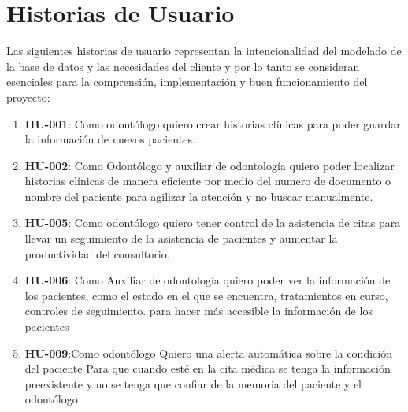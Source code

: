 \documentclass[conference]{IEEEtran}
\begin{document}
\section{Historias de Usuario} Las siguientes historias de usuario representan la intencionalidad del modelado de la base de datos y las necesidades del cliente y por lo tanto se consideran esenciales para la comprensión, implementación y buen funcionamiento del proyecto:

\begin{enumerate}

    \item \textbf{HU-001}:
    Como odontólogo \newline
    quiero crear historias clínicas\newline
    para poder guardar la información de nuevos pacientes.

    \item \textbf{HU-002}:
    Como Odontólogo y auxiliar de odontología\newline
    quiero poder localizar historias clínicas de manera eficiente por medio del numero de documento o nombre del paciente\newline
    para agilizar la atención y no buscar manualmente.

    \item \textbf{HU-005}:
    Como odontólogo\newline
    quiero tener control de la asistencia de citas\newline
    para llevar un seguimiento de la asistencia de pacientes y aumentar la productividad del consultorio.

    \item \textbf{HU-006}:
    Como Auxiliar de odontología\newline
    quiero poder ver la información de los pacientes, como el estado en el que se encuentra, tratamientos en curso, controles de seguimiento.\newline
    para hacer más accesible la información de los pacientes


    \item \textbf{HU-009}:Como odontólogo\newline
    Quiero una alerta automática sobre la condición del paciente\newline
    Para que cuando esté en la cita médica se tenga la información preexistente y no se tenga que confiar de la memoria del paciente y el odontólogo


\end{enumerate}
\end{document}
